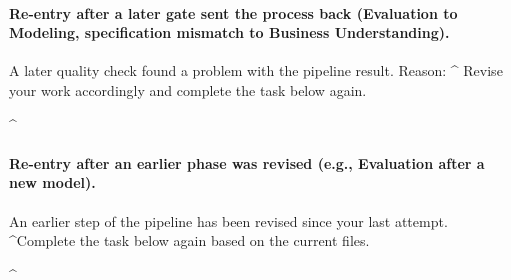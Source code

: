 \paragraph{Re-entry after a later gate sent the process back (Evaluation to Modeling, specification mismatch to Business Understanding).}\leavevmode
\begin{AppCPrompt}
A later quality check found a problem with the pipeline result.
Reason: ^
Revise your work accordingly and complete the task below again.

\AppCRest@^
\end{AppCPrompt}
\par\vspace{0pt plus 8\baselineskip}\vspace{0pt plus -8\baselineskip}
\paragraph{Re-entry after an earlier phase was revised (e.g., Evaluation after a new model).}\leavevmode
\begin{AppCPrompt}
An earlier step of the pipeline has been revised since your last attempt.
\AppCCont@^Complete the task below again based on the current files.

\AppCRest@^
\end{AppCPrompt}
